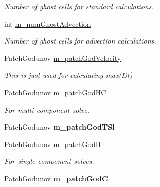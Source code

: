 \begin{DoxyCompactItemize}
\begin{DoxyCompactList}\small\item\em Number of ghost cells for standard calculations. \end{DoxyCompactList}\item 
int \hyperlink{class_a_m_r_level_mushy_layer_a5ac61ca83db82c5642e21d7cbe83f37b}{m\-\_\-num\-Ghost\-Advection}
\begin{DoxyCompactList}\small\item\em Number of ghost cells for advection calculations. \end{DoxyCompactList}\item 
Patch\-Godunov \hyperlink{class_a_m_r_level_mushy_layer_a90acda5f43d2b66e4bcbd989f9354b1b}{m\-\_\-patch\-God\-Velocity}
\begin{DoxyCompactList}\small\item\em This is just used for calculating max(\-Dt) \end{DoxyCompactList}\item 
\hypertarget{class_a_m_r_level_mushy_layer_a75f21997491a30f17dfd30f2dd6b3967}{Patch\-Godunov \hyperlink{class_a_m_r_level_mushy_layer_a75f21997491a30f17dfd30f2dd6b3967}{m\-\_\-patch\-God\-H\-C}}\label{class_a_m_r_level_mushy_layer_a75f21997491a30f17dfd30f2dd6b3967}

\begin{DoxyCompactList}\small\item\em For multi component solve. \end{DoxyCompactList}\item 
\hypertarget{class_a_m_r_level_mushy_layer_a40f638ac59f7b05a5832d28ec2aa9ea6}{Patch\-Godunov {\bfseries m\-\_\-patch\-God\-T\-Sl}}\label{class_a_m_r_level_mushy_layer_a40f638ac59f7b05a5832d28ec2aa9ea6}

\item 
\hypertarget{class_a_m_r_level_mushy_layer_a8f211bc8b76a04f3be8ab05725179b8c}{Patch\-Godunov \hyperlink{class_a_m_r_level_mushy_layer_a8f211bc8b76a04f3be8ab05725179b8c}{m\-\_\-patch\-God\-H}}\label{class_a_m_r_level_mushy_layer_a8f211bc8b76a04f3be8ab05725179b8c}

\begin{DoxyCompactList}\small\item\em For single component solves. \end{DoxyCompactList}\item 
\hypertarget{class_a_m_r_level_mushy_layer_af6f10ce77edec7cf1643c7c58cbd9ca5}{Patch\-Godunov {\bfseries m\-\_\-patch\-God\-C}}\label{class_a_m_r_level_mushy_layer_af6f10ce77edec7cf1643c7c58cbd9ca5}


\end{DoxyCompactItemize}
